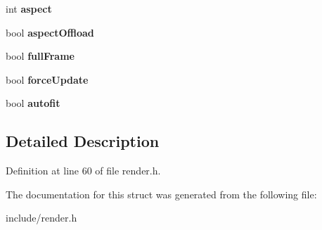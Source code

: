 \begin{DoxyCompactItemize}
\item 
\hypertarget{structRender__t_a896eec7e1b3369b17765448defd22074}{int {\bfseries aspect}}\label{structRender__t_a896eec7e1b3369b17765448defd22074}

\item 
\hypertarget{structRender__t_a090418c2fdbf5a62642535803821634d}{bool {\bfseries aspect\-Offload}}\label{structRender__t_a090418c2fdbf5a62642535803821634d}

\item 
\hypertarget{structRender__t_af06a3a37584a24e9a95379755d8a30b9}{bool {\bfseries full\-Frame}}\label{structRender__t_af06a3a37584a24e9a95379755d8a30b9}

\item 
\hypertarget{structRender__t_ac75e0229bc44b396f7149a1543f0da64}{bool {\bfseries force\-Update}}\label{structRender__t_ac75e0229bc44b396f7149a1543f0da64}

\item 
\hypertarget{structRender__t_a2f43bddf2516241377aead39566d0f5f}{bool {\bfseries autofit}}\label{structRender__t_a2f43bddf2516241377aead39566d0f5f}

\end{DoxyCompactItemize}


\subsection{Detailed Description}


Definition at line 60 of file render.\-h.



The documentation for this struct was generated from the following file\-:\begin{DoxyCompactItemize}
\item 
include/render.\-h\end{DoxyCompactItemize}
